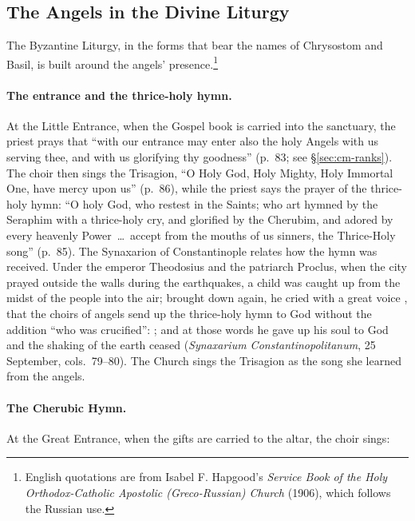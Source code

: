 \sectionguard
\subsection{The Angels in the Divine Liturgy}\label{sec:bz-liturgy}

The Byzantine Liturgy, in the forms that bear the names of Chrysostom and
Basil, is built around the angels' presence.\footnote{English quotations
are from Isabel F. Hapgood's \emph{Service Book of the Holy
Orthodox-Catholic Apostolic (Greco-Russian) Church} (1906), which follows
the Russian use.}

\paragraph{The entrance and the thrice-holy hymn.} At the Little Entrance,
when the Gospel book is carried into the sanctuary, the priest prays that
``with our entrance may enter also the holy Angels with us serving thee, and
with us glorifying thy goodness'' (p.~83; see \S\ref{sec:cm-ranks}). The choir
then sings the Trisagion, ``O Holy God, Holy Mighty, Holy Immortal One, have
mercy upon us'' (p.~86), while the priest says the prayer of the
thrice-holy hymn: ``O holy God, who restest in the Saints; who art hymned by
the Seraphim with a thrice-holy cry, and glorified by the Cherubim, and
adored by every heavenly Power~\dots\ accept from the mouths of us sinners,
the Thrice-Holy song'' (p.~85). The Synaxarion of Constantinople relates how
the hymn was received. Under the emperor Theodosius and the patriarch
Proclus, when the city prayed outside the walls during the earthquakes, a
child was caught up from the midst of the people into the air; brought down
again, he cried with a great voice , that the choirs of angels send up the thrice-holy
hymn to God without the addition ``who was crucified'': ; and at those words he
gave up his soul to God and the shaking of the earth ceased
(\emph{Synaxarium Constantinopolitanum}, 25 September, cols.\ 79--80). The
Church sings the Trisagion as the song she learned from the angels.

\paragraph{The Cherubic Hymn.} At the Great Entrance, when the gifts are
carried to the altar, the choir sings:

